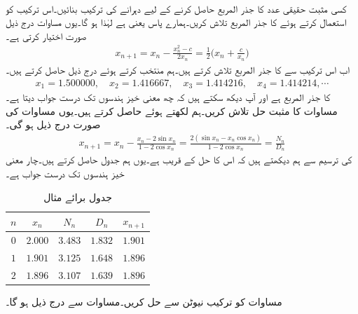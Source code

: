 \quad {}\\
کسی مثبت حقیقی عدد  کا جذر المربع حاصل کرنے کے لیے دہرانے کی ترکیب بنائیں۔اس ترکیب کو استعمال کرتے ہوئے  کا جذر المربع تلاش کریں۔ہمارے پاس   یعنی  ہے لہٰذا  ہو گا۔یوں مساوات  درج ذیل صورت اختیار کرتی ہے۔
\begin{align*}
x_{n+1}=x_n-\frac{x_n^2-c}{2x_n}=\frac{1}{2}\big(x_n+\frac{c}{x_n}\big)
\end{align*}
اب اس ترکیب سے  کا جذر المربع تلاش کرتے ہیں۔ہم  منتخب کرتے ہوئے درج ذیل حاصل کرتے ہیں۔
\begin{align*}
x_1=\num{1.500000},\quad x_2=\num{1.416667},\quad x_3=\num{1.414216},\quad x_4=\num{1.414214},\cdots
\end{align*}
 کا جذر المربع  ہے اور آپ دیکھ سکتے ہیں کہ  چھ معنی خیز ہندسوں تک درست جواب دیتا ہے۔
\quad {}\\
مساوات  کا مثبت حل تلاش کریں۔ہم  لکھتے ہوئے  حاصل کرتے ہیں۔یوں مساوات  کی صورت درج ذیل ہو گی۔
\begin{align*}
x_{n+1}=x_n-\frac{x_n-2\sin x_n}{1-2\cos x_n}=\frac{2(\sin x_n-x_n\cos x_n)}{1-2\cos x_n}=\frac{N_n}{D_n}
\end{align*}
 کی ترسیم سے ہم دیکھتے ہیں کہ اس کا حل  کے قریب ہے۔یوں ہم جدول  حاصل کرتے ہیں۔چار معنی خیز ہندسوں تک درست جواب  ہے۔
\begin{table}
\caption{جدول برائے مثال }
\label{جدول_مثال_اعدادی_ماورائی_الف}
\centering
\begin{tabular}{c|cccc}
$n$& $x_n$& $N_n$ &$D_n$  & $x_{n+1}$\\
\midrule
$0$& $2.000$& $3.483$ & $1.832$ & $1.901$\\
$1$& $1.901$ & $3.125$ & $1.648$ & $1.896$\\
$2$& $1.896$ & $3.107$ & $1.639$ & $1.896$
\end{tabular}
\end{table}
\quad {}
مساوات  کو ترکیب نیوٹن سے حل کریں۔مساوات  سے درج ذیل ہو گا۔
